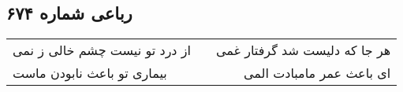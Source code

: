 \begin{center}
\section*{رباعی شماره ۶۷۴}
\label{sec:sh674}
\begin{longtable}{l p{0.5cm} r}
از درد تو نیست چشم خالی ز نمی
&&
هر جا که دلیست شد گرفتار غمی
\\
بیماری تو باعث نابودن ماست
&&
ای باعث عمر مامبادت المی
\\
\end{longtable}
\end{center}
